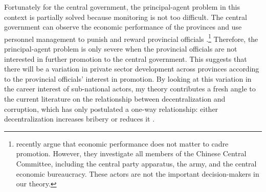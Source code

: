 \documentclass[12pt]{article}
\begin{document}
Fortunately for the central government, the principal-agent problem in this context is partially solved because monitoring is not too difficult. The central government can observe the economic performance of the provinces and use personnel management to punish and reward provincial officials \citep{Sheng2007, Li2005}.\footnote{\citet{Shih2012} recently argue that economic performance does not matter to cadre promotion. However, they investigate all members of the Chinese Central Committee, including the central party apparatus, the army, and the central economic bureaucracy. These actors are not the important decision-makers in our theory.} Therefore, the principal-agent problem is only severe when the provincial officials are not interested in further promotion to the central government. This suggests that there will be a variation in private sector development across provinces according to the provincial officials' interest in promotion. By looking at this variation in the career interest of sub-national actors, my theory contributes a fresh angle to the current literature on the relationship between decentralization and corruption, which has only postulated a one-way relationship: either decentralization increases bribery \citep{Fan2009} or reduces it \citep{Guerra2009}.
\end{document}
